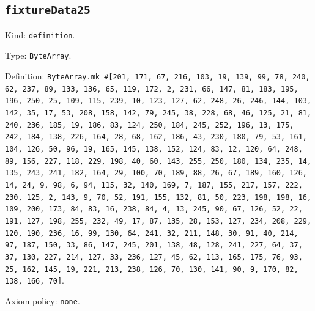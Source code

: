 \documentclass[11pt]{article}
\begin{document}
\subsection*{\texttt{fixtureData25}}
\noindent Kind: \texttt{definition}.\par
\noindent Type: \texttt{ByteArray}.\par
\noindent Definition: \texttt{ByteArray.mk \#[201, 171, 67, 216, 103, 19, 139, 99, 78, 240, 62, 237, 89, 133, 136, 65, 119, 172, 2, 231, 66, 147, 81, 183, 195, 196, 250, 25, 109, 115, 239, 10, 123, 127, 62, 248, 26, 246, 144, 103, 142, 35, 17, 53, 208, 158, 142, 79, 245, 38, 228, 68, 46, 125, 21, 81, 240, 236, 185, 19, 186, 83, 124, 250, 184, 245, 252, 196, 13, 175, 242, 184, 138, 226, 164, 28, 68, 162, 186, 43, 230, 180, 79, 53, 161, 104, 126, 50, 96, 19, 165, 145, 138, 152, 124, 83, 12, 120, 64, 248, 89, 156, 227, 118, 229, 198, 40, 60, 143, 255, 250, 180, 134, 235, 14, 135, 243, 241, 182, 164, 29, 100, 70, 189, 88, 26, 67, 189, 160, 126, 14, 24, 9, 98, 6, 94, 115, 32, 140, 169, 7, 187, 155, 217, 157, 222, 230, 125, 2, 143, 9, 70, 52, 191, 155, 132, 81, 50, 223, 198, 198, 16, 109, 200, 173, 84, 83, 16, 238, 84, 4, 13, 245, 90, 67, 126, 52, 22, 191, 127, 198, 255, 232, 49, 17, 87, 135, 28, 153, 127, 234, 208, 229, 120, 190, 236, 16, 99, 130, 64, 241, 32, 211, 148, 30, 91, 40, 214, 97, 187, 150, 33, 86, 147, 245, 201, 138, 48, 128, 241, 227, 64, 37, 37, 130, 227, 214, 127, 33, 236, 127, 45, 62, 113, 165, 175, 76, 93, 25, 162, 145, 19, 221, 213, 238, 126, 70, 130, 141, 90, 9, 170, 82, 138, 166, 70]}.\par
\noindent Axiom policy: \texttt{none}.\par
\end{document}
